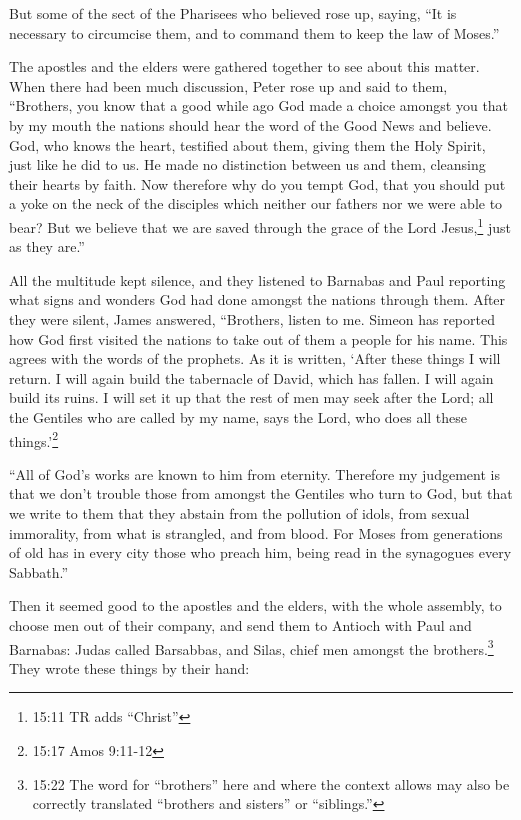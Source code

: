  But some of the sect of the Pharisees who believed rose up,
saying, ``It is necessary to circumcise them, and to command them to
keep the law of Moses.''

 The apostles and the elders were gathered together to see
about this matter.  When there had been much discussion,
Peter rose up and said to them, ``Brothers, you know that a good while
ago God made a choice amongst you that by my mouth the nations should
hear the word of the Good News and believe.  God, who knows
the heart, testified about them, giving them the Holy Spirit, just like
he did to us.  He made no distinction between us and them,
cleansing their hearts by faith.  Now therefore why do you
tempt God, that you should put a yoke on the neck of the disciples which
neither our fathers nor we were able to bear?  But we
believe that we are saved through the grace of the Lord
Jesus,\footnote{15:11 TR adds ``Christ''} just as they are.''

 All the multitude kept silence, and they listened to
Barnabas and Paul reporting what signs and wonders God had done amongst
the nations through them.  After they were silent, James
answered, ``Brothers, listen to me.  Simeon has reported
how God first visited the nations to take out of them a people for his
name.  This agrees with the words of the prophets. As it is
written,  `After these things I will return. I will again
build the tabernacle of David, which has fallen. I will again build its
ruins. I will set it up  that the rest of men may seek
after the Lord; all the Gentiles who are called by my name, says the
Lord, who does all these things.'\footnote{15:17 Amos 9:11-12}

 ``All of God's works are known to him from eternity.
 Therefore my judgement is that we don't trouble those from
amongst the Gentiles who turn to God,  but that we write to
them that they abstain from the pollution of idols, from sexual
immorality, from what is strangled, and from blood.  For
Moses from generations of old has in every city those who preach him,
being read in the synagogues every Sabbath.''

 Then it seemed good to the apostles and the elders, with
the whole assembly, to choose men out of their company, and send them to
Antioch with Paul and Barnabas: Judas called Barsabbas, and Silas, chief
men amongst the brothers.\footnote{15:22 The word for ``brothers'' here
  and where the context allows may also be correctly translated
  ``brothers and sisters'' or ``siblings.''}  They wrote
these things by their hand:

